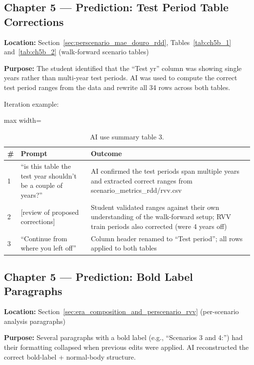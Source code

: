 \subsection{Chapter 5 --- Prediction: Test Period Table Corrections}\label{app_sub:chapter_5_prediction_test}

\textbf{Location: }Section~\ref{sec:perscenario_mae_douro_rdd}, Tables~\ref{tab:ch5b_1} and~\ref{tab:ch5b_2} (walk-forward scenario tables)

\textbf{Purpose: }The student identified that the “Test yr” column was showing single years rather than multi-year test periods. AI was used to compute the correct test period ranges from the data and rewrite all 34 rows across both tables.

Iteration example:

\begin{table}[htbp]
  \centering
  \caption{AI use summary table 3.}\label{tab:appe_3}
  \footnotesize
  \begin{adjustbox}{max width=\textwidth}
    \begin{tabularx}{\textwidth}{p{0.4cm}|p{5.0cm}|X}
  \toprule
  \# & Prompt & Outcome \\
  \midrule
  1 & ``is this table the test year shouldn’t be a couple of years?'' & AI confirmed the test periods span multiple years and extracted correct ranges from scenario\_metrics\_rdd/rvv.csv \\
  2 & [review of proposed corrections] & Student validated ranges against their own understanding of the walk-forward setup; RVV train periods also corrected (were 4 years off) \\
  3 & ``Continue from where you left off'' & Column header renamed to “Test period”; all rows applied to both tables \\
  \bottomrule
\end{tabularx}
  \end{adjustbox}

\end{table}


\subsection{Chapter 5 --- Prediction: Bold Label Paragraphs}\label{app_sub:chapter_5_prediction_bold}

\textbf{Location: }Section~\ref{sec:era_composition_and_perscenario_rvv} (per-scenario analysis paragraphs)

\textbf{Purpose: }Several paragraphs with a bold label (e.g., “Scenarios 3 and 4:”) had their formatting collapsed when previous edits were applied. AI reconstructed the correct bold-label + normal-body structure.


